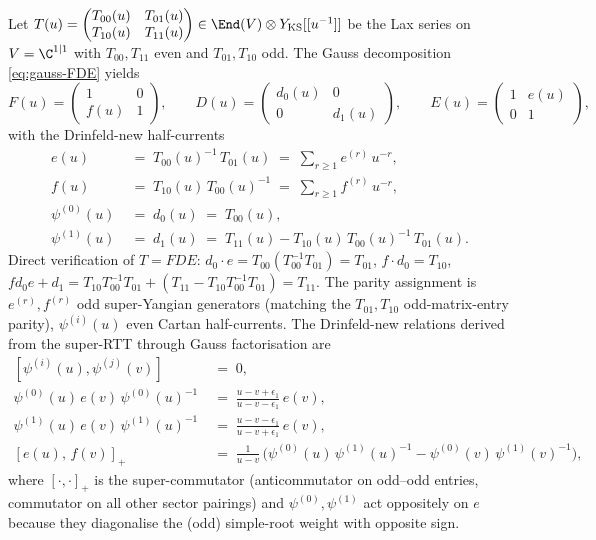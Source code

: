 \begin{definition}
\label{def:drinfeld-new-currents-ks}
Let
$T(u) =
\begin{pmatrix}
 T_{00}(u) & T_{01}(u) \\
 T_{10}(u) & T_{11}(u)
\end{pmatrix}
\in \End(V) \otimes Y_{\mathrm{KS}}[[u^{-1}]]$
be the Lax series on $V = \C^{1 \mid 1}$ with $T_{00}, T_{11}$ even
and $T_{01}, T_{10}$ odd. The Gauss decomposition
\eqref{eq:gauss-FDE} yields
\[
 F(u) =
 \begin{pmatrix}
 1 & 0 \\
 f(u) & 1
 \end{pmatrix},
 \qquad
 D(u) =
 \begin{pmatrix}
 d_0(u) & 0 \\
 0 & d_1(u)
 \end{pmatrix},
 \qquad
 E(u) =
 \begin{pmatrix}
 1 & e(u) \\
 0 & 1
 \end{pmatrix},
\]
with the Drinfeld-new half-currents
\begin{align}
 e(u) \;&=\; T_{00}(u)^{-1}\, T_{01}(u)
 \;=\; \sum_{r \geq 1} e^{(r)}\, u^{-r}, \\
 f(u) \;&=\; T_{10}(u)\, T_{00}(u)^{-1}
 \;=\; \sum_{r \geq 1} f^{(r)}\, u^{-r}, \\
 \psi^{(0)}(u) \;&=\; d_0(u) \;=\; T_{00}(u), \\
 \psi^{(1)}(u) \;&=\; d_1(u) \;=\; T_{11}(u) - T_{10}(u)\, T_{00}(u)^{-1}\, T_{01}(u).
\end{align}
Direct verification of $T = FDE$:
$d_0 \cdot e = T_{00}(T_{00}^{-1}T_{01}) = T_{01}$, $f \cdot d_0 = T_{10}$,
$fd_0 e + d_1 = T_{10}T_{00}^{-1}T_{01} + (T_{11} - T_{10}T_{00}^{-1}T_{01}) = T_{11}$.
The parity assignment is
$e^{(r)}, f^{(r)}$ odd super-Yangian generators (matching the
$T_{01}, T_{10}$ odd-matrix-entry parity), $\psi^{(i)}(u)$ even
Cartan half-currents. The Drinfeld-new relations derived from the
super-RTT through Gauss factorisation are
\begin{align}
\label{eq:drinfeld-new-psi-psi}
 [\psi^{(i)}(u), \psi^{(j)}(v)] \;&=\; 0, \\
\label{eq:drinfeld-new-psi-e}
 \psi^{(0)}(u)\, e(v)\, \psi^{(0)}(u)^{-1}
 \;&=\; \frac{u - v + \epsilon_1}{u - v - \epsilon_1}\, e(v), \\
\label{eq:drinfeld-new-psi1-e}
 \psi^{(1)}(u)\, e(v)\, \psi^{(1)}(u)^{-1}
 \;&=\; \frac{u - v - \epsilon_1}{u - v + \epsilon_1}\, e(v), \\
\label{eq:drinfeld-new-e-f}
 [e(u),\, f(v)]_+ \;&=\; \frac{1}{u - v}\,
 \bigl(\psi^{(0)}(u)\, \psi^{(1)}(u)^{-1}
 - \psi^{(0)}(v)\, \psi^{(1)}(v)^{-1}\bigr),
\end{align}
where $[\cdot, \cdot]_+$ is the super-commutator (anticommutator on
odd--odd entries, commutator on all other sector pairings) and
$\psi^{(0)}, \psi^{(1)}$ act oppositely on $e$ because they
diagonalise the (odd) simple-root weight with opposite sign.
\end{definition}


